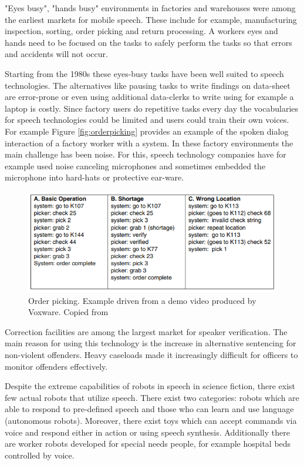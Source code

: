 \documentclass[11pt,a4paper,oneside,article]{memoir}
\begin{document}
"Eyes busy", "hands busy" environments in factories and warehouses were among the earliest markets for mobile speech. These include for example, manufacturing inspection, sorting, order picking and return processing. A workers eyes and hands need to be focused on the tasks to safely perform the tasks so that errors and accidents will not occur. 

Starting from the 1980s these eyes-busy tasks have been well suited to speech technologies. The alternatives like pausing tasks to write findings on data-sheet are error-prone or even using additional data-clerks to write using for example a laptop is costly. Since factory users do repetitive tasks every day the vocabularies for speech technologies could be limited and users could train their own voices. For example Figure \vref{fig:orderpicking} provides an example of the spoken dialog interaction of a factory worker with a system. In these factory environments the main challenge has been noise. For this, speech technology companies have for example used noise canceling microphones and sometimes embedded the microphone into hard-hats or protective ear-ware. \cite{markowitz}

\begin{figure}[h]
  \includegraphics[width=15cm]{orderpicking}
  \caption{Order picking. Example driven from a demo video produced by Voxware. Copied from \cite{markowitz}}
  \label{fig:orderpicking}
\end{figure}

Correction facilities are among the largest market for speaker verification. The main reason for using this technology is the increase in alternative sentencing for non-violent offenders. Heavy caseloads made it increasingly difficult for officers to monitor offenders effectively. \cite{markowitz}

Despite the extreme capabilities of robots in speech in science fiction, there exist few actual robots that utilize speech. There exist two categories: robots which are able to respond to pre-defined speech and those who can learn and use language (autonomous robots). Moreover, there exist toys which can accept commands via voice and respond either in action or using speech synthesis. Additionally there are worker robots developed for special needs people, for example hospital beds controlled by voice. \cite{markowitz}
\end{document}

